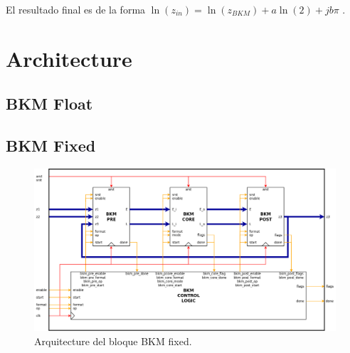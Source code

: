 \documentclass[10pt,a4paper]{book}
\begin{document}
   El resultado final es de la forma $\ln(z_{in}) = \ln(z_{BKM}) + a \ln(2) + j b \pi$ .


\chapter{Architecture}

   \section{BKM Float}

   \section{BKM Fixed}

      \begin{figure}[h]
         \centering
         \includegraphics[width=1.0\textwidth]{./figures/bkm_fixed.png}
         \caption{Arquitecture del bloque BKM fixed.}
         \label{fig:bkm_fixed}
      \end{figure}
\end{document}
